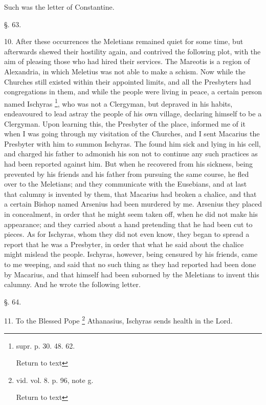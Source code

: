 Such was the letter of Constantine.

§. 63.

10. After these occurrences the Meletians
remained quiet for some time, but afterwards shewed their hostility
again, and contrived the following plot, with the aim of pleasing
those who had hired their services. The Mareotis is a region of
Alexandria, in which Meletius was not able to make a schism. Now while
the Churches still existed within their appointed limits, and all the
Presbyters had congregations in them, and while the people were living
in peace, a certain person named Ischyras \footnote{supr. p. 30. 48. 62.

Return to text}, who was not a Clergyman, but depraved in his habits,
endeavoured to lead astray the people of his own village, declaring
himself to be a Clergyman. Upon learning this, the Presbyter of the
place, informed me of it when I was going through my visitation of the
Churches, and I sent Macarius the Presbyter with him to summon
Ischyras. The found him sick and lying in his cell, and charged
his father to admonish his son not to continue any such practices as
had been reported against him. But when he recovered from his
sickness, being prevented by his friends and his father from pursuing
the same course, he fled over to the Meletians; and they communicate
with the Eusebians, and at last that calumny is invented by them, that
Macarius had broken a chalice, and that a certain Bishop named
Arsenius had been murdered by me. Arsenius they placed in concealment,
in order that he might seem taken off, when he did not make his
appearance; and they carried about a hand pretending that he had been
cut to pieces. As for Ischyras, whom they did not even know, they
began to spread a report that he was a Presbyter, in order that what
he said about the chalice might mislead the people. Ischyras, however,
being censured by his friends, came to me weeping, and said that no
such thing as they had reported had been done by Macarius, and that
himself had been suborned by the Meletians to invent this calumny. And
he wrote the following letter.

§. 64.

11. To the Blessed Pope \footnote{vid. vol. 8. p. 96, note g.

Return to text} Athanasius, Ischyras sends health in the Lord.

